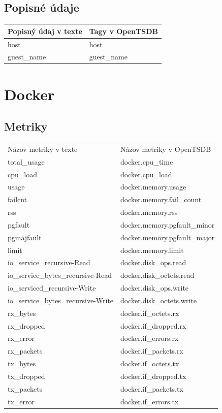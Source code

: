 \documentclass[printed,11pt,twoside,color,cover,table]{fithesis3}
\begin{document}
\begin{appendices}
\subsection{Popisné údaje}

\begin{center}
    \begin{tabular}{| l | l |}
    \hline
    Popisný údaj v texte & Tagy v OpenTSDB \\ \hline
    host & host\\ \hline
    guest\_name & guest\_name\\ \hline
    \end{tabular}
\end{center}

\section{Docker}
\subsection{Metriky}
\begin{center}
    \begin{tabular}{| l | l |}
    \hline
    Názov metriky v texte & Názov metriky v OpenTSDB \\
	total\_usage & docker.cpu\_time \\ \hline
    cpu\_load & docker.cpu\_load \\ \hline
    usage & docker.memory.usage \\ \hline
    failcnt & docker.memory.fail\_count \\ \hline
    rss & docker.memory.rss \\ \hline
    pgfault & docker.memory.pgfault\_minor \\ \hline
    pgmajfault & docker.memory.pgfault\_major \\ \hline
    limit & docker.memory.limit \\ \hline
    io\_service\_recursive-Read & docker.disk\_ops.read\\ \hline
    io\_service\_bytes\_recursive-Read & docker.disk\_octets.read\\ \hline
    io\_serviced\_recursive-Write & docker.disk\_ops.write\\ \hline
    io\_service\_bytes\_recursive-Write & docker.disk\_octets.write\\ \hline
    rx\_bytes & docker.if\_octets.rx\\ \hline
    rx\_dropped & docker.if\_dropped.rx\\ \hline
    rx\_error & docker.if\_errors.rx\\ \hline
    rx\_packets & docker.if\_packets.rx\\ \hline
    tx\_bytes & docker.if\_octets.tx\\ \hline
    tx\_dropped & docker.if\_dropped.tx\\ \hline
    tx\_packets & docker.if\_packets.tx\\ \hline
    tx\_error & docker.if\_errors.tx\\ \hline
    \end{tabular}
\end{center}


\end{appendices}
\end{document}
